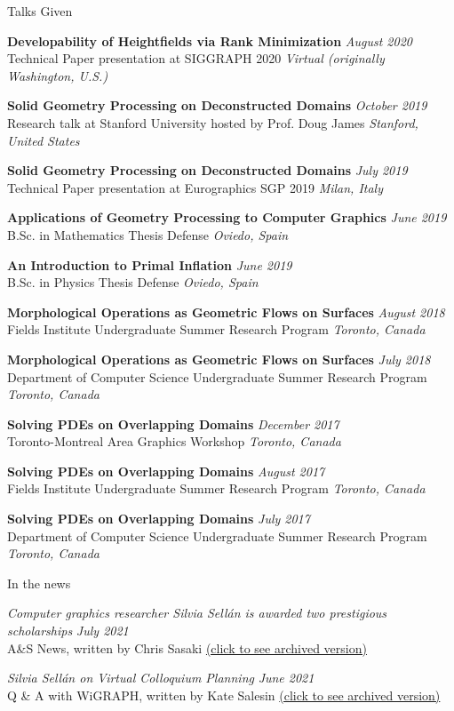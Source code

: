 \documentclass{resume}
\newcommand{\talk}[4]{
    {\bf #1} \hfill {\em \small #2} \\ %
    {\small #3} \hfill {\em \small #4}
}
\begin{document}
\begin{rSection}{Talks Given}
\talk{Developability of Heightfields via Rank Minimization}{August 2020}
{Technical Paper presentation at SIGGRAPH 2020}{Virtual (originally Washington, U.S.)}

\talk{Solid Geometry Processing on Deconstructed Domains}{October 2019}
{Research talk at Stanford University hosted by Prof. Doug James}{Stanford, United States}

\talk{Solid Geometry Processing on Deconstructed Domains}{July 2019}
{Technical Paper presentation at Eurographics SGP 2019}{Milan, Italy}

\talk{Applications of Geometry Processing to Computer Graphics}{June 2019}
{B.Sc. in Mathematics Thesis Defense}{Oviedo, Spain}

\talk{An Introduction to Primal Inflation}{June 2019}
{B.Sc. in Physics Thesis Defense}{Oviedo, Spain}

\talk{Morphological Operations as Geometric Flows on Surfaces}{August 2018}
{Fields Institute Undergraduate Summer Research Program}{Toronto, Canada}

\talk{Morphological Operations as Geometric Flows on Surfaces}{July 2018}
{Department of Computer Science Undergraduate Summer Research Program}{Toronto, Canada}

\talk{Solving PDEs on Overlapping Domains}{December 2017}
{Toronto-Montreal Area Graphics Workshop}{Toronto, Canada}

\talk{Solving PDEs on Overlapping Domains}{August 2017}
{Fields Institute Undergraduate Summer Research Program}{Toronto, Canada}

\talk{Solving PDEs on Overlapping Domains}{July 2017}
{Department of Computer Science Undergraduate Summer Research Program}{Toronto, Canada}

\end{rSection}

\begin{rSection}{In the news}

{\it Computer graphics researcher Silvia Sellán is awarded two prestigious scholarships} \hfill {\small \it July 2021}\\ 
{\small A\&S News, written by Chris Sasaki \href{https://web.cs.toronto.edu/news-events/news/silvia-sellan-scholarships}{(click to see archived version)}} 

{\it Silvia Sellán on Virtual Colloquium Planning} \hfill {\small \it June 2021}\\ 
{\small Q \& A with WiGRAPH, written by Kate Salesin \href{https://www.wigraph.org/spotlights/silvia-sellan-on-virtual-colloquium-planning/}{(click to see archived version)}} 

\end{rSection}
\end{document}
